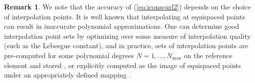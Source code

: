 \documentclass[10pt]{amsart}
\theoremstyle{definition}
\theoremstyle{lemma}
\newtheorem*{remark}{Remark}
\theoremstyle{theorem}
\theoremstyle{assumption}
\begin{document}
{\begin{remark}
We note that the accuracy of (\ref{eq:iconscurl2}) depends on the choice of interpolation points.  It is well known that interpolating at equispaced points can result in inaccurate polynomial approximations.  One can determine good interpolation point sets by optimizing over some measure of interpolation quality (such as the Lebesgue constant), and in practice, sets of interpolation points are pre-computed for some polynomial degrees $N = 1,\ldots, N_{\max}$ on the reference element and stored \cite{chen1996optimal, hesthaven1998electrostatics}, or explicitly computed as the image of equispaced points under an appropriately defined mapping \cite{blyth2006lobatto, warburton2006explicit, chan2015comparison}.  
\end{remark}

}
\end{document}
